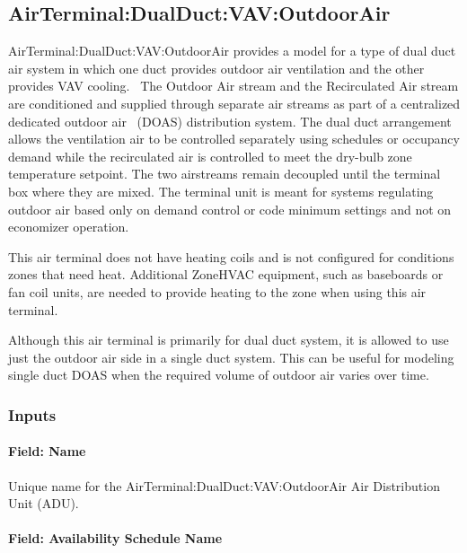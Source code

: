 \subsection{AirTerminal:DualDuct:VAV:OutdoorAir}\label{airterminaldualductvavoutdoorair}

AirTerminal:DualDuct:VAV:OutdoorAir provides a model for a type of dual duct air system in which one duct provides outdoor air ventilation and the other provides VAV cooling.~ The Outdoor Air stream and the Recirculated Air stream are conditioned and supplied through separate air streams as part of a centralized dedicated outdoor air~ (DOAS) distribution system. The dual duct arrangement allows the ventilation air to be controlled separately using schedules or occupancy demand while the recirculated air is controlled to meet the dry-bulb zone temperature setpoint. The two airstreams remain decoupled until the terminal box where they are mixed. The terminal unit is meant for systems regulating outdoor air based only on demand control or code minimum settings and not on economizer operation.

This air terminal does not have heating coils and is not configured for conditions zones that need heat. Additional ZoneHVAC equipment, such as baseboards or fan coil units, are needed to provide heating to the zone when using this air terminal.

Although this air terminal is primarily for dual duct system, it is allowed to use just the outdoor air side in a single duct system. This can be useful for modeling single duct DOAS when the required volume of outdoor air varies over time.

\subsubsection{Inputs}\label{inputs-16-000}

\paragraph{Field: Name}\label{field-name-16}

Unique name for the AirTerminal:DualDuct:VAV:OutdoorAir Air Distribution Unit (ADU).

\paragraph{Field: Availability Schedule Name}\label{field-availability-schedule-name-13}

